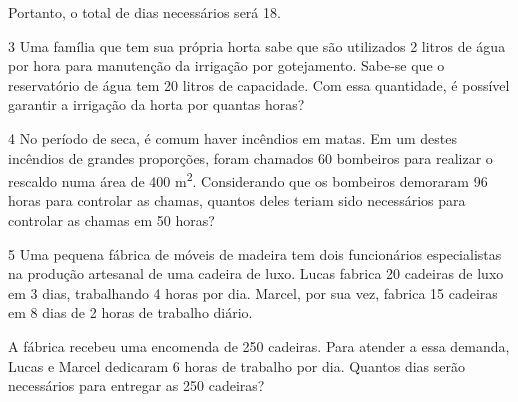 \begin{escolha}
\begin{escolha}
\begin{boxmedio}
{Portanto, o total de dias necessários será 18.}
\end{boxmedio}

\num{3} Uma família que tem sua própria horta sabe que são utilizados 2
litros de água por hora para manutenção da irrigação por gotejamento.
Sabe-se que o reservatório de água tem 20 litros de capacidade. Com essa
quantidade, é possível garantir a irrigação da horta por quantas horas?

\begin{boxpeq}
\end{boxpeq}

\num{4} No período de seca, é comum haver incêndios em matas. Em um destes
incêndios de grandes proporções, foram chamados 60 bombeiros para
realizar o rescaldo numa área de 400 m\textsuperscript{2}. Considerando 
que os bombeiros demoraram 96 horas para controlar as chamas, quantos 
deles teriam sido necessários para controlar as chamas em 50 horas?


\num{5} Uma pequena fábrica de móveis de madeira tem dois funcionários
especialistas na produção artesanal de uma cadeira de luxo. Lucas
fabrica 20 cadeiras de luxo em 3 dias, trabalhando 4 horas por dia.
Marcel, por sua vez, fabrica 15 cadeiras em 8 dias de 2 horas
de trabalho diário.

A fábrica recebeu uma encomenda de 250 cadeiras. Para atender a essa demanda,
Lucas e Marcel dedicaram 6 horas de trabalho por dia. Quantos dias serão
necessários para entregar as 250 cadeiras?

\begin{boxpeq}
\end{boxpeq}


\end{escolha}
\end{escolha}
